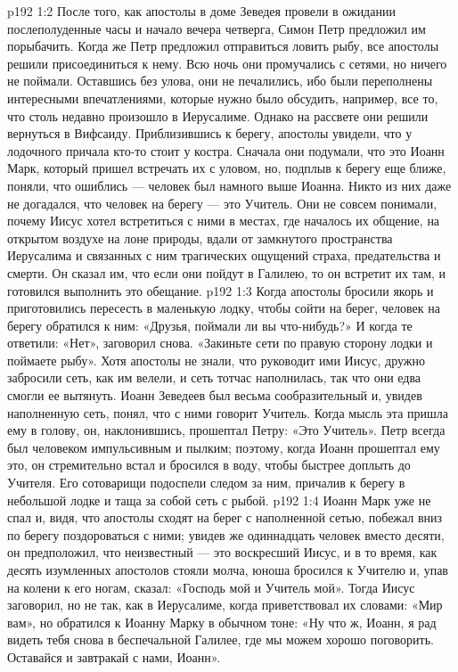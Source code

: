 \vs p192 1:2 После того, как апостолы в доме Зеведея провели в ожидании послеполуденные часы и начало вечера четверга, Симон Петр предложил им порыбачить. Когда же Петр предложил отправиться ловить рыбу, все апостолы решили присоединиться к нему. Всю ночь они промучались с сетями, но ничего не поймали. Оставшись без улова, они не печалились, ибо были переполнены интересными впечатлениями, которые нужно было обсудить, например, все то, что столь недавно произошло в Иерусалиме. Однако на рассвете они решили вернуться в Вифсаиду. Приблизившись к берегу, апостолы увидели, что у лодочного причала кто\hyp{}то стоит у костра. Сначала они подумали, что это Иоанн Марк, который пришел встречать их с уловом, но, подплыв к берегу еще ближе, поняли, что ошиблись --- человек был намного выше Иоанна. Никто из них даже не догадался, что человек на берегу --- это Учитель. Они не совсем понимали, почему Иисус хотел встретиться с ними в местах, где началось их общение, на открытом воздухе на лоне природы, вдали от замкнутого пространства Иерусалима и связанных с ним трагических ощущений страха, предательства и смерти. Он сказал им, что если они пойдут в Галилею, то он встретит их там, и готовился выполнить это обещание.
\vs p192 1:3 Когда апостолы бросили якорь и приготовились пересесть в маленькую лодку, чтобы сойти на берег, человек на берегу обратился к ним: «Друзья, поймали ли вы что\hyp{}нибудь?» И когда те ответили: «Нет», заговорил снова. «Закиньте сети по правую сторону лодки и поймаете рыбу». Хотя апостолы не знали, что руководит ими Иисус, дружно забросили сеть, как им велели, и сеть тотчас наполнилась, так что они едва смогли ее вытянуть. Иоанн Зеведеев был весьма сообразительный и, увидев наполненную сеть, понял, что с ними говорит Учитель. Когда мысль эта пришла ему в голову, он, наклонившись, прошептал Петру: «Это Учитель». Петр всегда был человеком импульсивным и пылким; поэтому, когда Иоанн прошептал ему это, он стремительно встал и бросился в воду, чтобы быстрее доплыть до Учителя. Его сотоварищи подоспели следом за ним, причалив к берегу в небольшой лодке и таща за собой сеть с рыбой.
\vs p192 1:4 Иоанн Марк уже не спал и, видя, что апостолы сходят на берег с наполненной сетью, побежал вниз по берегу поздороваться с ними; увидев же одиннадцать человек вместо десяти, он предположил, что неизвестный --- это воскресший Иисус, и в то время, как десять изумленных апостолов стояли молча, юноша бросился к Учителю и, упав на колени к его ногам, сказал: «Господь мой и Учитель мой». Тогда Иисус заговорил, но не так, как в Иерусалиме, когда приветствовал их словами: «Мир вам», но обратился к Иоанну Марку в обычном тоне: «Ну что ж, Иоанн, я рад видеть тебя снова в беспечальной Галилее, где мы можем хорошо поговорить. Оставайся и завтракай с нами, Иоанн».

